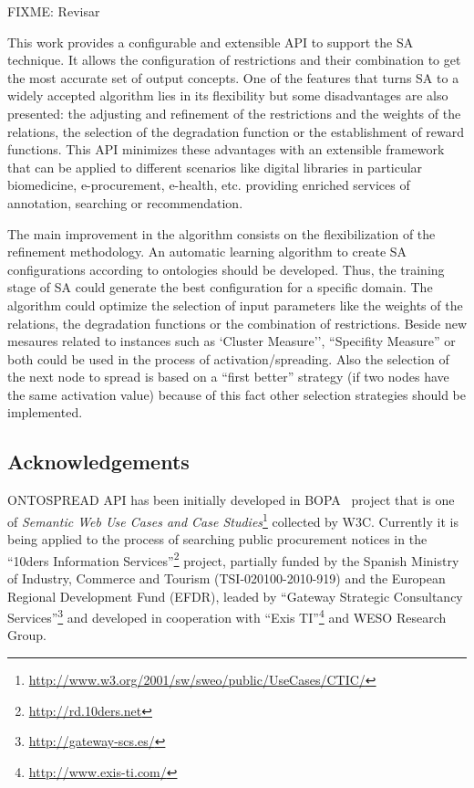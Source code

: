 FIXME: Revisar

This work provides a configurable and extensible API to support the SA technique. It allows
the configuration of restrictions and their combination to get
the most accurate set of output concepts. One of the features that
turns SA to a widely accepted algorithm lies in its flexibility 
but some disadvantages are also presented: the adjusting and refinement of
the restrictions and the weights of the relations, the selection of the
degradation function or the establishment of reward functions. This API
minimizes these advantages with an extensible framework that can be
applied to different scenarios like digital libraries in particular
biomedicine, e-procurement, e-health, etc. providing enriched services
of annotation, searching or recommendation.

The main improvement in the algorithm consists on the flexibilization of
the refinement methodology. An automatic learning algorithm to create SA configurations
according to ontologies should be developed. Thus, the training stage of SA could generate
the best configuration for a specific domain. The algorithm could optimize the selection 
of input parameters like the weights of the relations, the degradation functions 
or the combination of restrictions. Beside new mesaures related to instances such as `Cluster
Measure'', ``Specifity Measure'' or both could be used in the process of activation/spreading.
Also the selection of the next node to spread is based on a ``first
better'' strategy (if two nodes have the same activation value) because of this fact
other selection strategies should be implemented.

\subsection*{Acknowledgements}
ONTOSPREAD API has been initially developed in BOPA~\cite{bopaEstonia} project that is
one of \textit{Semantic Web Use Cases and Case
Studies}\footnote{\url{http://www.w3.org/2001/sw/sweo/public/UseCases/CTIC/}}
collected by W3C. Currently it is being applied to the process of searching
public procurement notices in the ``10ders Information Services''\footnote{\url{http://rd.10ders.net}} project, partially funded by 
the Spanish Ministry of Industry, Commerce and Tourism (TSI-020100-2010-919) 
and the European Regional Development Fund (EFDR), leaded by ``Gateway Strategic Consultancy Services''\footnote{\url{http://gateway-scs.es/}} 
and developed in cooperation with ``Exis TI''\footnote{\url{http://www.exis-ti.com/}}  and WESO Research Group.